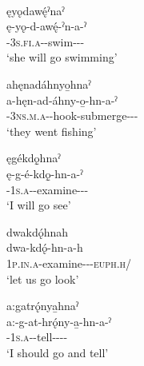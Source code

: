 \ea\label{ex:dislocendex2}  {\dislocative}\\
ęyǫdawę́ˀnaˀ\\
\gll ę-yǫ-d-awę́-ˀn-a-ˀ\\
 \fut-\textsc{3s.fi.a}-{\semireflexive}-swim-{\dislocative}-{\joinerA}-{\punctual}\\
\glt `she will go swimming'
\z


\ea\label{ex:dislocendex3}  {\dislocative}
\ea ahęnadáhnyo̱hnaˀ\\
\gll a-hęn-ad-áhny-o̱-hn-a-ˀ\\
 {\factual}-\textsc{3ns.m.a}-{\semireflexive}-hook-submerge-{\dislocative}-{\joinerA}-{\punctual}\\
\glt `they went fishing'

\ex ęgékdǫ̱hnaˀ \\
\gll ę-g-é-kdǫ̱-hn-a-ˀ\\
\fut-\textsc{1s.a}-{\joinerE}-examine-{\dislocative}-{\joinerA}-{\punctual}\\
\glt ‘I will go see’


\ex dwakdǫ́hnah\\
\gll dwa-kdǫ́-hn-a-h\\
 \textsc{1p.in.a}-examine-{\dislocative}-{\joinerA}-\textsc{euph.h}/{\noaspect}\\
\glt `let us go look'


\ex a:gatrǫ́nya̱hnaˀ\\
\gll a:-g-at-hrǫ́ny-a̱-hn-a-ˀ\\
 {\indefinite}-\textsc{1s.a}-{\semireflexive}-tell-{\joinerA}-{\dislocative}-{\joinerA}-{\punctual}\\
\glt `I should go and tell'

